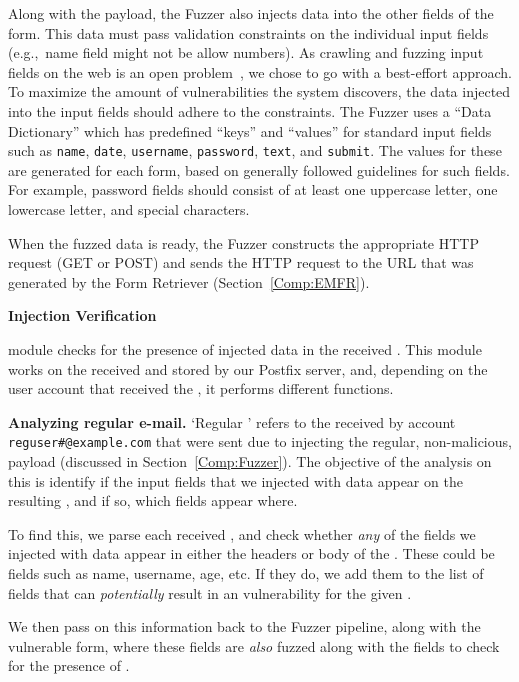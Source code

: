 Along with the payload, the Fuzzer also injects data into the other fields of the form. This data must pass validation constraints on the individual input fields (e.g.,\ name field might not be allow numbers).  As crawling and fuzzing input fields on the web is an open problem~\cite{raghavan2000crawling}, we chose to go with a best-effort approach. To maximize the amount of vulnerabilities the system discovers, the data injected into the input fields should adhere to the constraints. The Fuzzer uses a ``Data Dictionary'' which has predefined ``keys'' and ``values'' for standard input fields such as \texttt{name}, \texttt{date}, \texttt{username}, \texttt{password}, \texttt{text}, and \texttt{submit}.
The values for these are generated for each form, based on generally followed guidelines for such fields. For example, password fields should consist of at least one uppercase letter, one lowercase letter, and special characters.

When the fuzzed data is ready, the Fuzzer constructs the appropriate HTTP request (GET or POST) and sends the HTTP request to the URL that was generated by the \Email Form Retriever (Section~\ref{Comp:EMFR}). 


\textbf{Injection Verification}

module checks for the presence of injected data in the received \emails. This module works on the \emails received and stored by our Postfix server, and, depending on the user account that received the \email, it performs different functions.

\noindent\textbf{Analyzing regular e-mail.}
\sloppy
`Regular \email' refers to the \emails received by account {\lstinline{reguser#@example.com}} that were sent due to injecting the regular, non-malicious, payload (discussed in Section~\ref{Comp:Fuzzer}). The objective of the analysis on this \email is identify if the input fields that we injected with data appear on the resulting \email, and if so, which fields appear where.

To find this, we parse each received \email, and check whether \emph{any} of the fields we injected with data appear in either the headers or body of the \email. These could be fields such as name, username, age, etc. If they do, we add them to the list of fields that can \emph{potentially} result in an \ehi vulnerability for the given \email. 

We then pass on this information back to the Fuzzer pipeline, along with the vulnerable form, where these fields are \emph{also} fuzzed along with the \email fields to check for the presence of \ehi.

